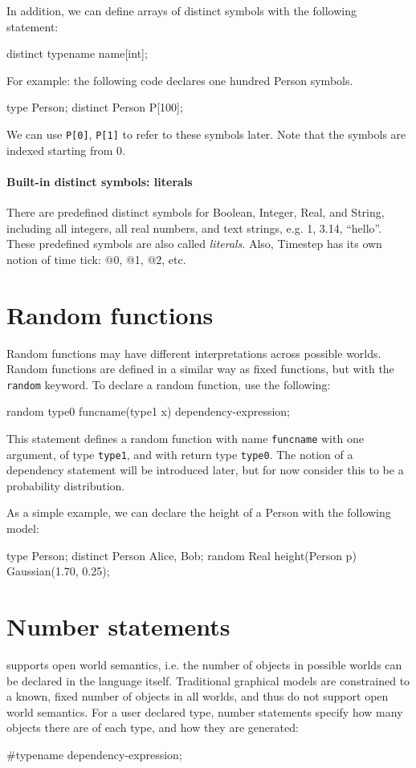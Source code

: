 \documentclass[12pt]{article}
\begin{document}
In addition, we can define arrays of distinct symbols with the following statement:
\begin{blogcode}
distinct typename name[int];
\end{blogcode}
For example: the following \bl code declares one hundred Person symbols.  
\begin{blogcode}
type Person;
distinct Person P[100];
\end{blogcode}

We can use \verb|P[0]|, \verb|P[1]| to refer to these symbols later. Note that the symbols are indexed starting from 0.

\paragraph{Built-in distinct symbols: literals}
There are predefined distinct symbols for Boolean, Integer, Real, and String, including all integers, all real numbers, and text strings, e.g. 1, 3.14, ``hello''. These predefined symbols are also called {\em literals}.  Also, Timestep has its own notion of time tick: @0, @1, @2, etc. 



\section{Random functions}
Random functions may have different interpretations across possible worlds. Random functions are defined in a similar way as fixed functions, but with the \texttt{random} keyword.
To declare a random function, use the following:
\begin{blogcode}
random type0 funcname(type1 x) dependency-expression;
\end{blogcode}
This statement defines a random function with name \texttt{funcname} with one argument, of type \texttt{type1}, and with return type \texttt{type0}.  The notion of a dependency statement will be introduced later, but for now consider this to be a probability distribution.

As a simple example, we can declare the height of a Person with the following \bl model: 
\begin{blogcode}
type Person;
distinct Person Alice, Bob;
random Real height(Person p) ~ Gaussian(1.70, 0.25);
\end{blogcode}



\section{Number statements}
\bl supports open world semantics, i.e. the number of objects in possible worlds can be declared in the language itself.
Traditional graphical models are constrained to a known, fixed number of objects in all worlds, and thus do not support open world semantics. 
For a user declared type, number statements specify how many objects there are of each type, and how they are generated:
\begin{blogcode}
#typename dependency-expression;
\end{blogcode}
\end{document}
